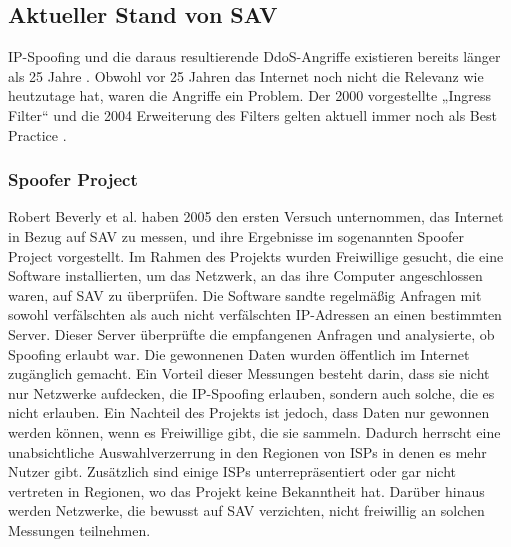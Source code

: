 \documentclass[sigplan,screen]{acmart}
\begin{document}
\subsection{Aktueller Stand von SAV}
IP-Spoofing und die daraus resultierende DdoS-Angriffe existieren bereits länger als 25 Jahre \cite{manrs01}. Obwohl vor 25 Jahren das Internet noch nicht die Relevanz wie heutzutage hat, waren die Angriffe ein Problem. Der 2000 vorgestellte „Ingress Filter“ \cite{Ingress01} und die 2004 Erweiterung des Filters \cite{Bcp84} gelten aktuell immer noch als Best Practice \cite{CRP01} \cite{Lone01} \cite{Hal01} \cite{manrs01}.  

\subsubsection{Spoofer Project}
Robert Beverly et al. \cite{Spoofer01} haben 2005 den ersten Versuch unternommen, das Internet in Bezug auf SAV zu messen, und ihre Ergebnisse im sogenannten Spoofer Project vorgestellt. Im Rahmen des Projekts wurden Freiwillige gesucht, die eine Software installierten, um das Netzwerk, an das ihre Computer angeschlossen waren, auf SAV zu überprüfen. Die Software sandte regelmäßig Anfragen mit sowohl verfälschten als auch nicht verfälschten IP-Adressen an einen bestimmten Server. Dieser Server überprüfte die empfangenen Anfragen und analysierte, ob Spoofing erlaubt war. Die gewonnenen Daten wurden öffentlich im Internet zugänglich gemacht. Ein Vorteil dieser Messungen besteht darin, dass sie nicht nur Netzwerke aufdecken, die IP-Spoofing erlauben, sondern auch solche, die es nicht erlauben. Ein Nachteil des Projekts ist jedoch, dass Daten nur gewonnen werden können, wenn es Freiwillige gibt, die sie sammeln. Dadurch herrscht eine unabsichtliche Auswahlverzerrung in den Regionen von ISPs in denen es mehr Nutzer gibt. Zusätzlich sind einige ISPs unterrepräsentiert oder gar nicht vertreten in Regionen, wo das Projekt keine Bekanntheit hat. Darüber hinaus werden Netzwerke, die bewusst auf SAV verzichten, nicht freiwillig an solchen Messungen teilnehmen.
\end{document}
